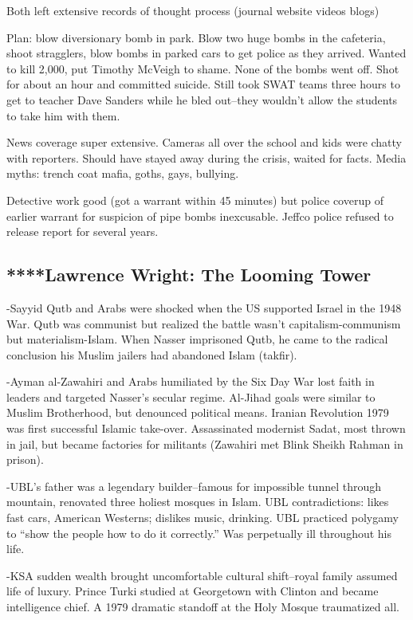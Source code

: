 \documentclass[
]{article}
\begin{document}
Both left extensive records of thought process (journal website videos
blogs)

Plan: blow diversionary bomb in park. Blow two huge bombs in the
cafeteria, shoot stragglers, blow bombs in parked cars to get police as
they arrived. Wanted to kill 2,000, put Timothy McVeigh to shame. None
of the bombs went off. Shot for about an hour and committed suicide.
Still took SWAT teams three hours to get to teacher Dave Sanders while
he bled out--they wouldn't allow the students to take him with them.

News coverage super extensive. Cameras all over the school and kids were
chatty with reporters. Should have stayed away during the crisis, waited
for facts. Media myths: trench coat mafia, goths, gays, bullying.

Detective work good (got a warrant within 45 minutes) but police coverup
of earlier warrant for suspicion of pipe bombs inexcusable. Jeffco
police refused to release report for several years.

\hypertarget{lawrence-wright-the-looming-tower}{%
\subsection{****Lawrence Wright: The Looming
Tower}\label{lawrence-wright-the-looming-tower}}

-Sayyid Qutb and Arabs were shocked when the US supported Israel in the
1948 War. Qutb was communist but realized the battle wasn't
capitalism-communism but materialism-Islam. When Nasser imprisoned Qutb,
he came to the radical conclusion his Muslim jailers had abandoned Islam
(takfir).

-Ayman al-Zawahiri and Arabs humiliated by the Six Day War lost faith in
leaders and targeted Nasser's secular regime. Al-Jihad goals were
similar to Muslim Brotherhood, but denounced political means. Iranian
Revolution 1979 was first successful Islamic take-over. Assassinated
modernist Sadat, most thrown in jail, but became factories for militants
(Zawahiri met Blink Sheikh Rahman in prison).

-UBL's father was a legendary builder--famous for impossible tunnel
through mountain, renovated three holiest mosques in Islam. UBL
contradictions: likes fast cars, American Westerns; dislikes music,
drinking. UBL practiced polygamy to ``show the people how to do it
correctly.'' Was perpetually ill throughout his life.

-KSA sudden wealth brought uncomfortable cultural shift--royal family
assumed life of luxury. Prince Turki studied at Georgetown with Clinton
and became intelligence chief. A 1979 dramatic standoff at the Holy
Mosque traumatized all.
\end{document}
